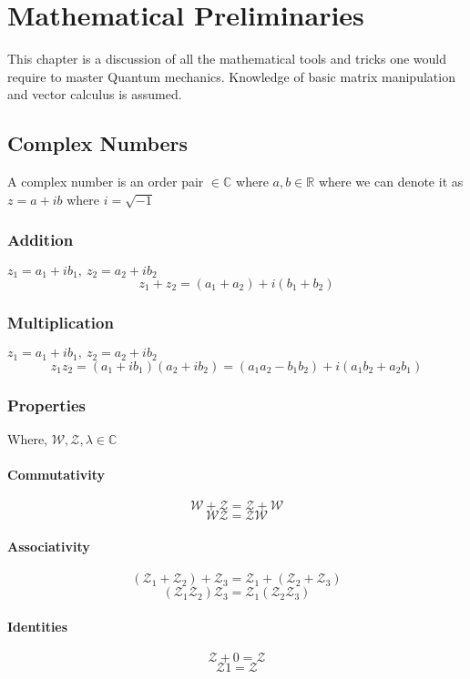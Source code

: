 \chapter{Mathematical Preliminaries}
This chapter is a discussion of all the mathematical tools and tricks one would require to master Quantum mechanics. Knowledge of basic matrix manipulation and vector calculus is assumed.

\section{Complex Numbers}
A complex number is an order pair ${} \in \mathbb{C}$ where $a,b \in \mathbb{R}$ where we can denote it as $z = a + ib$ where $i = \sqrt{-1}$
\subsection{Addition}
$z_{1} = a_{1} + ib_{1}, \ z_{2} = a_{2} + ib_{2}$
$$z_{1} + z_{2} =  (a_{1} + a_{2}) + i(b_{1} + b_{2})$$
\subsection{Multiplication}
$z_{1} = a_{1} + ib_{1}, \ z_{2} = a_{2} + ib_{2}$
$$z_{1}z_{2} =  (a_{1} + ib_{1})(a_{2} + ib_{2}) = (a_{1}a_{2} - b_{1}b_{2}) + i(a_{1}b_{2} + a_{2}b_{1})$$
\subsection{Properties}
Where, $\mathcal{W}, \mathcal{Z}, \lambda \in \mathbb{C}$
\subsubsection{Commutativity}
$$\mathcal{W} + \mathcal{Z} = \mathcal{Z} + \mathcal{W}$$
$$\mathcal{W}\mathcal{Z} = \mathcal{Z}\mathcal{W}$$
\subsubsection{Associativity}
$$(\mathcal{Z}_1 + \mathcal{Z}_2) + \mathcal{Z}_3 = \mathcal{Z}_1 + (\mathcal{Z}_2 + \mathcal{Z}_3)$$
$$(\mathcal{Z}_1\mathcal{Z}_2)\mathcal{Z}_3 = \mathcal{Z}_1(\mathcal{Z}_2\mathcal{Z}_3)$$
\subsubsection{Identities}
$$\mathcal{Z} + 0 = \mathcal{Z}$$
$$\mathcal{Z}1 = \mathcal{Z}$$
